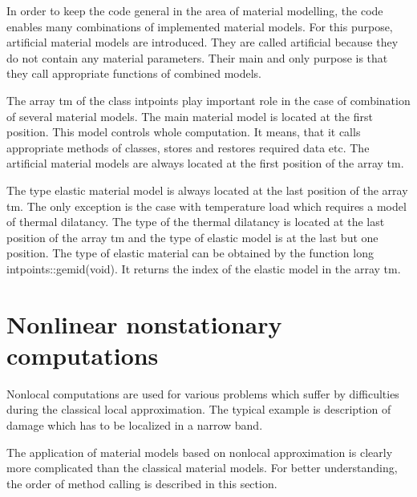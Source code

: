 In order to keep the code general in the area of material modelling, the code enables many combinations
of implemented material models. For this purpose, artificial material models are introduced. They are called
artificial because they do not contain any material parameters. Their main and only purpose is that they
call appropriate functions of combined models.

The array {\sf tm} of the class {\sf intpoints} play important role in the case of combination of several
material models. The main material model is located at the first position. This model controls whole
computation. It means, that it calls appropriate methods of classes, stores and restores required data etc.
The artificial material models are always located at the first position of the array {\sf tm}.

The type elastic material model is always located at the last position of the array {\sf tm}. The only exception
is the case with temperature load which requires a model of thermal dilatancy. The type of the thermal dilatancy
is located at the last position of the array {\sf tm} and the type of elastic model is at the last but one position.
The type of elastic material can be obtained by the function {\sf long intpoints::gemid(void)}. It returns
the index of the elastic model in the array {\sf tm}.

\section{Nonlinear nonstationary computations}

Nonlocal computations are used for various problems which suffer by difficulties during the classical
local approximation. The typical example is description of damage which has to be localized in a narrow
band.

The application of material models based on nonlocal approximation is clearly more complicated than
the classical material models. For better understanding, the order of method calling is described in this section.

